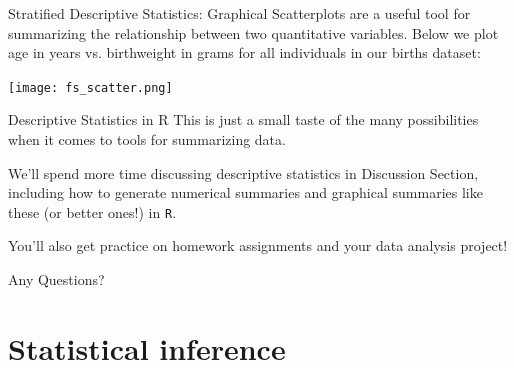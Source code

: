 \documentclass[10pt,t]{beamer}
\begin{document}
\begin{frame}{Stratified Descriptive Statistics: Graphical}
Scatterplots are a useful tool for summarizing the relationship between two quantitative variables. Below we plot age in years vs. birthweight in grams for all individuals in our births dataset:

\vspace{0.3cm}

\centering \texttt{[image: fs\_scatter.png]}

\end{frame}

\begin{frame}{Descriptive Statistics in R}
This is just a small taste of the many possibilities when it comes to tools for summarizing data.

\vspace{0.3cm}

We’ll spend more time discussing descriptive statistics in Discussion Section, including how to generate numerical summaries and graphical summaries like these (or better ones!) in \texttt{R}.

\vspace{0.3cm}

You’ll also get practice on homework assignments and your data analysis project!

\end{frame}

\begin{frame}[c]
\centering \huge Any Questions?
\end{frame}

\section{Statistical inference}
\end{document}
